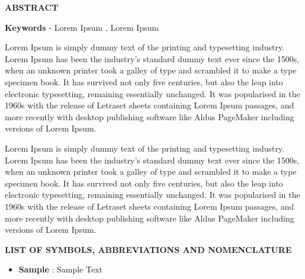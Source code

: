 \documentclass[12pt,a4paper]{report}
\begin{document}
\begin{CJK*}{UTF8}{bkai}
    \begin{center}
        \textbf{ABSTRACT}
    \end{center}

    \textbf{Keywords} - Lorem Ipsum , Lorem Ipsum

    \vspace{0.8cm}

    Lorem Ipsum is simply dummy text of the printing and typesetting industry. Lorem Ipsum has been the industry's standard dummy text ever since the 1500s, when an unknown printer took a galley of type and scrambled it to make a type specimen book. It has survived not only five centuries, but also the leap into electronic typesetting, remaining essentially unchanged. It was popularised in the 1960s with the release of Letraset sheets containing Lorem Ipsum passages, and more recently with desktop publishing software like Aldus PageMaker including versions of Lorem Ipsum.

    Lorem Ipsum is simply dummy text of the printing and typesetting industry. Lorem Ipsum has been the industry's standard dummy text ever since the 1500s, when an unknown printer took a galley of type and scrambled it to make a type specimen book. It has survived not only five centuries, but also the leap into electronic typesetting, remaining essentially unchanged. It was popularised in the 1960s with the release of Letraset sheets containing Lorem Ipsum passages, and more recently with desktop publishing software like Aldus PageMaker including versions of Lorem Ipsum.

    \newpage
    \tableofcontents %
    \newpage
    \listoftables


    \newpage
    \listoffigures



    \newpage
    \begin{center}
        \textbf{LIST OF SYMBOLS, ABBREVIATIONS AND NOMENCLATURE}
    \end{center}

    \begin{itemize}
        \item[]\textbf{ Sample}  : Sample Text
    \end{itemize}


\end{CJK*}
\end{document}
